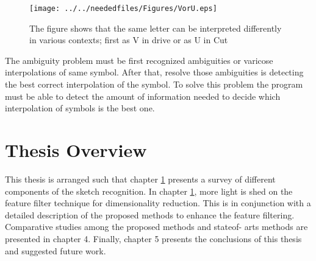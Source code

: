 \begin{figure}	
	\centering
		\texttt{[image: ../../neededfiles/Figures/VorU.eps]}
	\caption[Ambiguities Handwriting ]{The figure shows that the same letter can be interpreted differently in various contexts; first as V in drive or as U in Cut}
\label{fig:VorU}
\end{figure}

The ambiguity problem must be first recognized ambiguities or varicose interpolations of same symbol. After that, resolve those ambiguities is detecting the best correct interpolation of the symbol.  To solve this problem the program must be able to detect the amount of information needed to decide which interpolation of symbols is the best one. 


\section{Thesis Overview}
This thesis is arranged such that chapter \ref{} presents a survey of different components of the
sketch recognition. In chapter \ref{}, more light is shed on the feature filter technique for dimensionality
reduction. This is in conjunction with a detailed description of the proposed methods to
enhance the feature filtering. Comparative studies among the proposed methods and stateof-
arts methods are presented in chapter 4. Finally, chapter 5 presents the conclusions of
this thesis and suggested future work.
%
%
%
%
%




